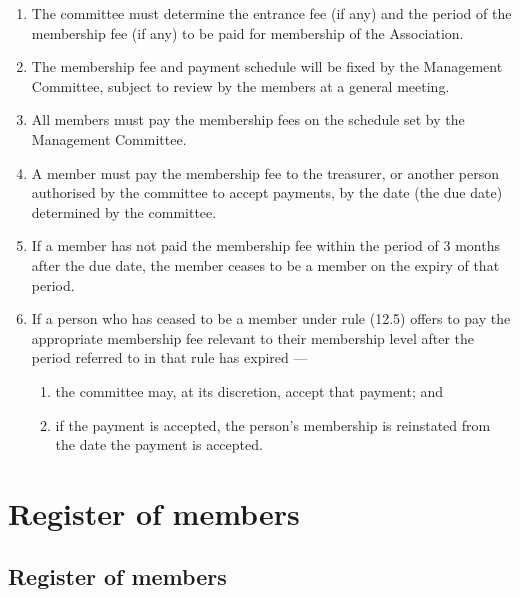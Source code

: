 \documentclass[../constitution.tex]{subfiles}
\begin{document}
\begin{enumerate}

\item The committee must determine the entrance fee (if any) and the period of the membership fee (if any) to be paid for membership of the Association.
\item The membership fee and payment schedule will be fixed by the Management Committee, subject to review by the members at a general meeting.
\item All members must pay the membership fees on the schedule set by the Management Committee.
\item A member must pay the membership fee to the treasurer, or another person authorised by the committee to accept payments, by the date (the due date) determined by the committee.
\item If a member has not paid the membership fee within the period of 3 months after the due date, the member ceases to be a member on the expiry of that period.
\item If a person who has ceased to be a member under rule (12.5) offers to pay the appropriate membership fee relevant to their membership level after the period referred to in that rule has expired ---

  \begin{enumerate}
  
  \item the committee may, at its discretion, accept that payment; and
  \item if the payment is accepted, the person's membership is reinstated from the date the payment is accepted.
  \end{enumerate}
\end{enumerate}

\hypertarget{division-3-register-of-members}{%
\section{Register of members}\label{division-3-register-of-members}}

\hypertarget{register-of-members}{%
\subsection{Register of members}\label{register-of-members}}
\end{document}
